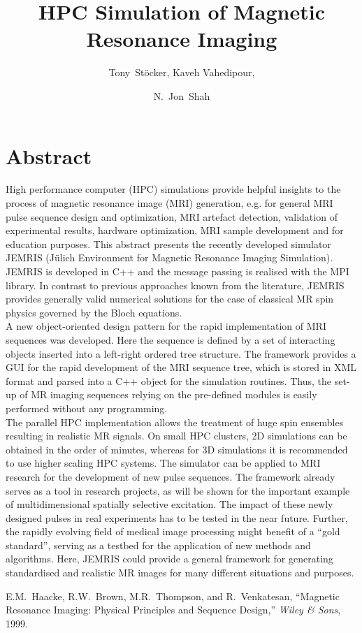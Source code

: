 \documentclass{nic-series}
\begin{document}
 

\title{HPC Simulation of Magnetic Resonance Imaging}

\author{Tony~St\"ocker, Kaveh Vahedipour, \and N.~Jon~Shah }


\maketitle

\section*{Abstract}
High performance computer (HPC) simulations provide helpful insights to the process of magnetic resonance
image (MRI) generation,  e.g. for general MRI pulse sequence design \cite{haacke} and optimization, MRI artefact detection,
validation of experimental results, hardware optimization, MRI sample development and for education purposes. This abstract presents
the recently developed simulator JEMRIS (J\"ulich Environment for Magnetic Resonance Imaging Simulation). JEMRIS is
developed in C++ and the message passing is realised with the MPI library. In contrast to previous approaches known from the literature,
JEMRIS provides generally valid numerical solutions for the case of classical MR spin physics governed by the Bloch equations.\\
A new object-oriented design pattern for the rapid implementation of MRI
sequences was developed. Here the sequence is defined by a set of interacting objects inserted into a left-right ordered tree structure. 
The framework provides a GUI for the rapid development of the MRI sequence tree, which is stored in XML format and parsed into a
C++ object for the simulation routines. Thus, the set-up of MR imaging sequences relying on the pre-defined modules is easily performed
without any programming.\\
The parallel HPC implementation allows the treatment of huge spin ensembles
resulting in realistic MR signals. On small HPC clusters, 2D simulations can be obtained in the order of minutes,
whereas for 3D simulations it is recommended to use higher scaling HPC systems. The simulator can be
applied to MRI research for the development of new pulse sequences.
The framework already serves as a tool in research projects, as will be shown for the important example of
multidimensional spatially selective excitation.
The impact of these newly designed pulses in real experiments has to be tested in the near future.
Further, the rapidly evolving field of medical image processing might benefit of a “gold standard”, serving as a testbed
for the application of new methods and algorithms. Here, JEMRIS could provide a general framework for generating
standardised and realistic MR images for many different situations and purposes.

\begin{thebibliography}{10}

E.M.~Haacke, R.W.~Brown, M.R.~Thompson, and R.~Venkatesan, ``Magnetic Resonance Imaging: Physical Principles and Sequence Design,''
  \emph{Wiley \& Sons}, 1999.
\end{thebibliography}
\end{document}
